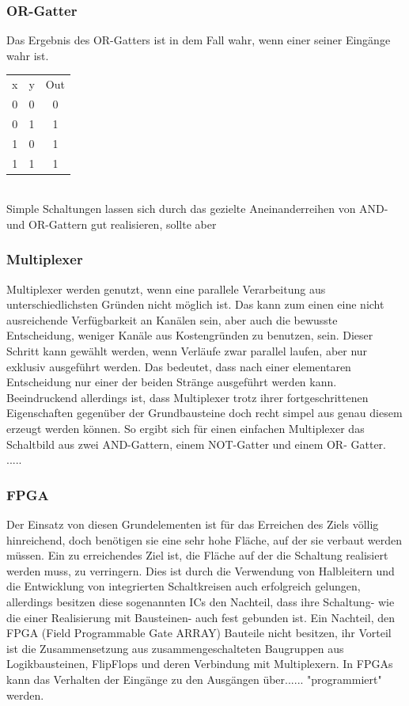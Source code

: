 \documentclass[conference]{IEEEtran}
\begin{document}
\subsubsection{OR-Gatter}
Das Ergebnis des OR-Gatters ist in dem Fall wahr, wenn einer seiner Eingänge wahr ist.\\
\begin{tabular}[h]{ccc}
x&y&Out\\
0&0&0\\
0&1&1\\
1&0&1\\
1&1&1\\
\end{tabular}
\\Simple Schaltungen lassen sich durch das gezielte Aneinanderreihen von AND- und OR-Gattern gut realisieren, sollte aber 
\subsubsection{Multiplexer}
Multiplexer werden genutzt, wenn eine parallele Verarbeitung aus unterschiedlichsten Gründen nicht möglich ist. Das kann zum einen eine nicht ausreichende Verfügbarkeit an Kanälen sein, aber auch die bewusste Entscheidung, weniger Kanäle aus Kostengründen zu benutzen, sein. Dieser Schritt kann gewählt werden, wenn Verläufe zwar parallel laufen, aber nur exklusiv ausgeführt werden. Das bedeutet, dass nach einer elementaren Entscheidung nur einer der beiden Stränge ausgeführt werden kann. Beeindruckend allerdings ist, dass Multiplexer trotz ihrer fortgeschrittenen Eigenschaften gegenüber der Grundbausteine doch recht simpel aus genau diesem erzeugt werden können. So ergibt sich für einen einfachen Multiplexer das Schaltbild aus zwei AND-Gattern, einem NOT-Gatter und einem OR- Gatter. .....
\subsubsection{FPGA}
Der Einsatz von diesen Grundelementen ist für das Erreichen des Ziels völlig hinreichend, doch benötigen sie eine sehr hohe Fläche, auf der sie verbaut werden müssen. Ein zu erreichendes Ziel ist, die Fläche auf der die Schaltung realisiert werden muss, zu verringern. Dies ist durch die Verwendung von Halbleitern und die Entwicklung von integrierten Schaltkreisen auch erfolgreich gelungen, allerdings besitzen diese sogenannten ICs den Nachteil, dass ihre Schaltung- wie die einer Realisierung mit Bausteinen- auch fest gebunden ist. Ein Nachteil, den FPGA (Field Programmable Gate ARRAY) Bauteile nicht besitzen, ihr Vorteil ist die Zusammensetzung aus zusammengeschalteten Baugruppen aus Logikbausteinen, FlipFlops und deren Verbindung mit Multiplexern. In FPGAs kann das Verhalten der Eingänge zu den Ausgängen über{\color{red}...... }"programmiert" werden.
\end{document}
